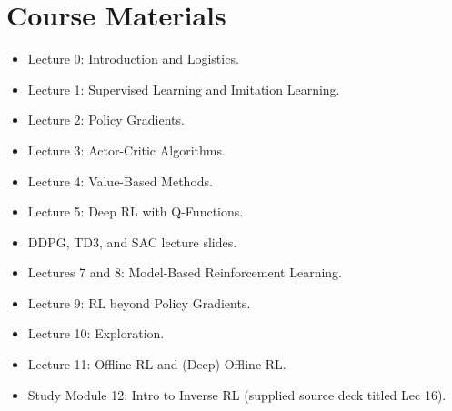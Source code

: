 \documentclass[11pt,a4paper]{book}
\begin{document}
\chapter{Course Materials}
\begin{itemize}
\item Lecture 0: Introduction and Logistics.
\item Lecture 1: Supervised Learning and Imitation Learning.
\item Lecture 2: Policy Gradients.
\item Lecture 3: Actor-Critic Algorithms.
\item Lecture 4: Value-Based Methods.
\item Lecture 5: Deep RL with Q-Functions.
\item DDPG, TD3, and SAC lecture slides.
\item Lectures 7 and 8: Model-Based Reinforcement Learning.
\item Lecture 9: RL beyond Policy Gradients.
\item Lecture 10: Exploration.
\item Lecture 11: Offline RL and (Deep) Offline RL.
\item Study Module 12: Intro to Inverse RL (supplied source deck titled Lec 16).
\end{itemize}
\end{document}
